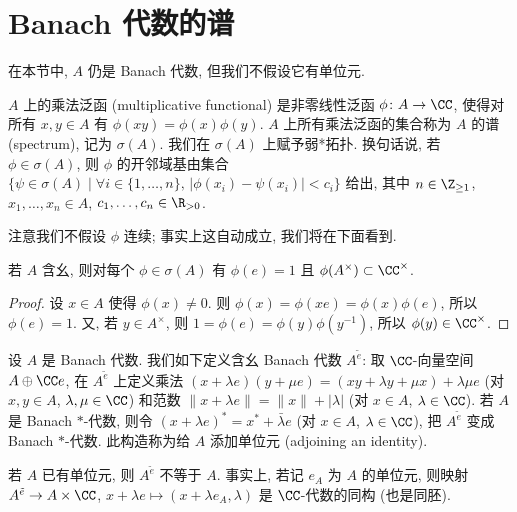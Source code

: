 \section{Banach 代数的谱}
在本节中, $A$ 仍是 Banach 代数, 但我们不假设它有单位元.

\begin{definition}
\label{def:II.2.1}
$A$ 上的乘法泛函 (multiplicative functional) 是非零线性泛函 $\phi \colon A \to \CC$, 使得对所有 $x, y \in A$ 有 $\phi(xy) = \phi(x)\phi(y)$.
$A$ 上所有乘法泛函的集合称为 $A$ 的谱 (spectrum), 记为 $\sigma(A)$. 我们在 $\sigma(A)$ 上赋予弱*拓扑. 换句话说, 若 $\phi \in \sigma(A)$, 则 $\phi$ 的开邻域基由集合 $\{\psi \in \sigma(A) \mid \forall i \in \{1, \ldots, n\},\, |\phi(x_i) - \psi(x_i)| < c_i\}$ 给出, 其中 $n \in \Z_{\geq 1}$, $x_1, \ldots, x_n \in A$, $c_1, \ldots, c_n \in \R_{>0}$.
\end{definition}

注意我们不假设 $\phi$ 连续; 事实上这自动成立, 我们将在下面看到.

\begin{lemma}[乘法泛函在单位元上取值 $1$]
\label{lem:II.2.2}
若 $A$ 含幺, 则对每个 $\phi \in \sigma(A)$ 有 $\phi(e) = 1$ 且 $\phi(A^{\times}) \subset \CC^{\times}$.
\end{lemma}

\begin{proof}
设 $x \in A$ 使得 $\phi(x) \neq 0$. 则 $\phi(x) = \phi(xe) = \phi(x)\phi(e)$, 所以 $\phi(e) = 1$. 又, 若 $y \in A^{\times}$, 则 $1 = \phi(e) = \phi(y)\phi(y^{-1})$, 所以 $\phi(y) \in \CC^{\times}$.
\end{proof}

\begin{definition}
\label{def:II.2.3}
设 $A$ 是 Banach 代数. 我们如下定义含幺 Banach 代数 $A^{\tilde{e}}$: 取 $\CC$-向量空间 $A \oplus \CC e$, 在 $A^{\tilde{e}}$ 上定义乘法 $(x + \lambda e)(y + \mu e) = (xy + \lambda y + \mu x) + \lambda\mu e$ (对 $x, y \in A$, $\lambda, \mu \in \CC$) 和范数 $\|x + \lambda e\| = \|x\| + |\lambda|$ (对 $x \in A$, $\lambda \in \CC$). 若 $A$ 是 Banach $*$-代数, 则令 $(x + \lambda e)^* = x^* + \bar{\lambda}e$ (对 $x \in A$, $\lambda \in \CC$), 把 $A^{\tilde{e}}$ 变成 Banach $*$-代数.
此构造称为给 $A$ 添加单位元 (adjoining an identity).
\end{definition}

\begin{remark}[$A$ 已含幺的情形]
\label{rem:II.2.4}
若 $A$ 已有单位元, 则 $A^{\tilde{e}}$ 不等于 $A$. 事实上, 若记 $e_A$ 为 $A$ 的单位元, 则映射 $A^{\tilde{e}} \to A \times \CC$, $x + \lambda e \longmapsto (x + \lambda e_A, \lambda)$ 是 $\CC$-代数的同构 (也是同胚).
\end{remark}

